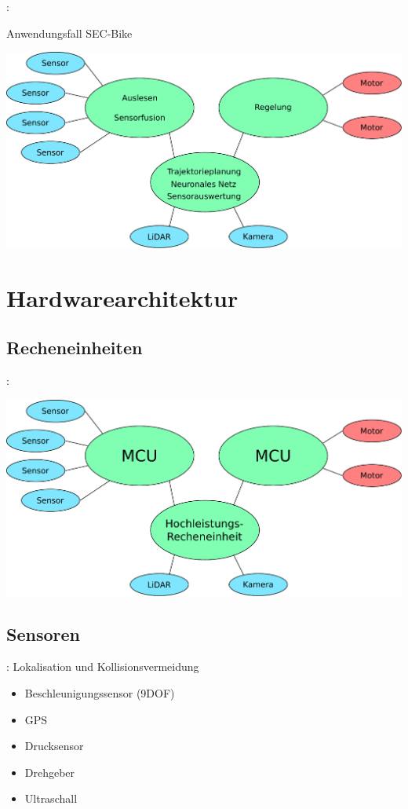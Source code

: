 \documentclass{beamer}
\begin{document}
\begin{frame}{\insertsection: \insertsubsection}

	Anwendungsfall SEC-Bike

	\includegraphics[width=\linewidth]{aufgaben2}

\end{frame}

\section{Hardwarearchitektur}
\subsection{Recheneinheiten}

\begin{frame}{\insertsection: \insertsubsection}

\includegraphics[width=\linewidth]{aufgaben_mcu}

\end{frame}

\subsection{Sensoren}
\begin{frame}{\insertsection: \insertsubsection}	
	Lokalisation und Kollisionsvermeidung
	\begin{itemize}
		\item Beschleunigungssensor (9DOF)
		\item GPS
		\item Drucksensor
		\item Drehgeber
		\item Ultraschall
	\end{itemize}
\end{frame}
\end{document}
